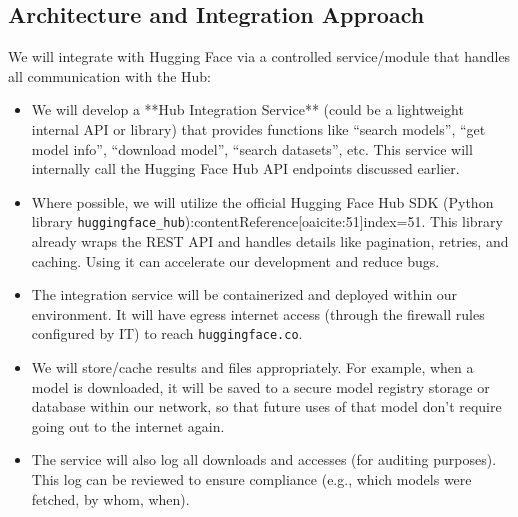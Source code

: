 \documentclass{article}
\begin{document}
\subsection*{Architecture and Integration Approach}
We will integrate with Hugging Face via a controlled service/module that handles all communication with the Hub:
\begin{itemize}
    \item We will develop a **Hub Integration Service** (could be a lightweight internal API or library) that provides functions like “search models”, “get model info”, “download model”, “search datasets”, etc. This service will internally call the Hugging Face Hub API endpoints discussed earlier.
    \item Where possible, we will utilize the official Hugging Face Hub SDK (Python library \texttt{huggingface\_hub}):contentReference[oaicite:51]{index=51}. This library already wraps the REST API and handles details like pagination, retries, and caching. Using it can accelerate our development and reduce bugs.
    \item The integration service will be containerized and deployed within our environment. It will have egress internet access (through the firewall rules configured by IT) to reach \texttt{huggingface.co}.
    \item We will store/cache results and files appropriately. For example, when a model is downloaded, it will be saved to a secure model registry storage or database within our network, so that future uses of that model don’t require going out to the internet again.
    \item The service will also log all downloads and accesses (for auditing purposes). This log can be reviewed to ensure compliance (e.g., which models were fetched, by whom, when).
\end{itemize}
\end{document}
